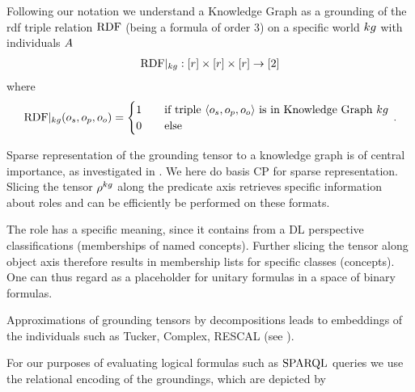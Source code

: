 
Following our notation we understand a Knowledge Graph as a grounding of the rdf triple relation $\mathrm{RDF}$ (being a formula of order 3) on a specific world $kg$ with individuals $A$
\begin{align*}
	{\mathrm{RDF}}|_{kg} : [r] \times [r] \times [r] \rightarrow [2]
\end{align*}
where
\begin{align*}
	{\mathrm{RDF}}|_{kg}(o_{s}, o_{p}, o_{o}) =
	\begin{cases}
	1 \quad & \text{if triple $\braket{o_{s}, o_{p}, o_{o}}$ is in Knowledge Graph $kg$} \\
	0  \quad & \text{else}
	\end{cases} \, .
\end{align*} 


Sparse representation of the grounding tensor to a knowledge graph is of central importance, as investigated in \cite{bigerl_tentris_2020}.
We here do basis CP for sparse representation.
Slicing the tensor $\rho^{kg}$ along the predicate axis retrieves specific information about roles and can be efficiently be performed on these formats.
 
The role \rdftype has a specific meaning, since it contains from a DL perspective classifications (memberships of named concepts).
Further slicing the tensor along object axis therefore results in membership lists for specific classes (concepts).
One can thus regard \rdftype as a placeholder for unitary formulas in a space of binary formulas. 

Approximations of grounding tensors by decompositions leads to embeddings of the individuals such as Tucker, Complex, RESCAL (see \cite{nickel_review_2016}).

For  our purposes of evaluating logical formulas such as $\mathrm{SPARQL}$ queries we use the relational encoding of the groundings, which are depicted by
 \begin{center}
	
\end{center}
 
 
 
 

